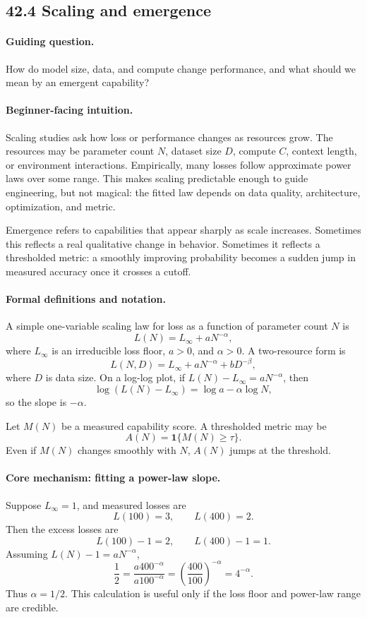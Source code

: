 \subsection{42.4 Scaling and emergence}

\paragraph{Guiding question.}
How do model size, data, and compute change performance, and what should we mean by an emergent capability?

\paragraph{Beginner-facing intuition.}
Scaling studies ask how loss or performance changes as resources grow. The resources may be parameter count \(N\), dataset size \(D\), compute \(C\), context length, or environment interactions. Empirically, many losses follow approximate power laws over some range. This makes scaling predictable enough to guide engineering, but not magical: the fitted law depends on data quality, architecture, optimization, and metric.

Emergence refers to capabilities that appear sharply as scale increases. Sometimes this reflects a real qualitative change in behavior. Sometimes it reflects a thresholded metric: a smoothly improving probability becomes a sudden jump in measured accuracy once it crosses a cutoff.

\paragraph{Formal definitions and notation.}
A simple one-variable scaling law for loss as a function of parameter count \(N\) is
\[
\boxed{
L(N)=L_\infty+aN^{-\alpha},
}
\]
where \(L_\infty\) is an irreducible loss floor, \(a>0\), and \(\alpha>0\). A two-resource form is
\[
L(N,D)=L_\infty+aN^{-\alpha}+bD^{-\beta},
\]
where \(D\) is data size. On a log-log plot, if \(L(N)-L_\infty=aN^{-\alpha}\), then
\[
\log(L(N)-L_\infty)=\log a-\alpha\log N,
\]
so the slope is \(-\alpha\).

Let \(M(N)\) be a measured capability score. A thresholded metric may be
\[
A(N)=\mathbf{1}\{M(N)\geq \tau\}.
\]
Even if \(M(N)\) changes smoothly with \(N\), \(A(N)\) jumps at the threshold.

\paragraph{Core mechanism: fitting a power-law slope.}
Suppose \(L_\infty=1\), and measured losses are
\[
L(100)=3,\qquad L(400)=2.
\]
Then the excess losses are
\[
L(100)-1=2,\qquad L(400)-1=1.
\]
Assuming \(L(N)-1=aN^{-\alpha}\),
\[
\frac{1}{2}=\frac{a400^{-\alpha}}{a100^{-\alpha}}
=\left(\frac{400}{100}\right)^{-\alpha}
=4^{-\alpha}.
\]
Thus \(\alpha=1/2\). This calculation is useful only if the loss floor and power-law range are credible.

